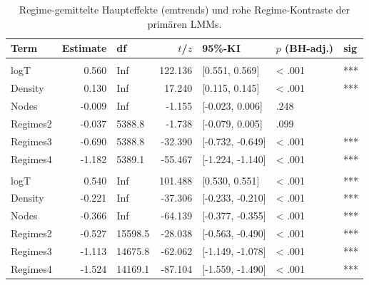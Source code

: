 \begin{table}[!h]
\centering
\caption{\label{tab:main_effects_averaged}Regime-gemittelte Haupteffekte (emtrends) und rohe Regime-Kontraste der prim\"aren LMMs.}
\centering
\begin{threeparttable}
\begin{tabular}[t]{lrlrlll}
\toprule
Term & Estimate & df & $t$/$z$ & 95\%-KI & $p$ (BH-adj.) & sig\\
\midrule
\addlinespace[0.3em]
\multicolumn{7}{l}{\textbf{temporal (A)}}\\
\hspace{1em}logT & 0.560 & Inf & 122.136 & {}[0.551, 0.569] & < .001 & ***\\
\hspace{1em}Density & 0.130 & Inf & 17.240 & {}[0.115, 0.145] & < .001 & ***\\
\hspace{1em}Nodes & -0.009 & Inf & -1.155 & {}[-0.023, 0.006] & .248 & \\
\hspace{1em}Regimes2 & -0.037 & 5388.8 & -1.738 & {}[-0.079, 0.005] & .099 & \\
\hspace{1em}Regimes3 & -0.690 & 5388.8 & -32.390 & {}[-0.732, -0.649] & < .001 & ***\\
\hspace{1em}Regimes4 & -1.182 & 5389.1 & -55.467 & {}[-1.224, -1.140] & < .001 & ***\\
\addlinespace[0.3em]
\multicolumn{7}{l}{\textbf{contemporaneous (K)}}\\
\hspace{1em}logT & 0.540 & Inf & 101.488 & {}[0.530, 0.551] & < .001 & ***\\
\hspace{1em}Density & -0.221 & Inf & -37.306 & {}[-0.233, -0.210] & < .001 & ***\\
\hspace{1em}Nodes & -0.366 & Inf & -64.139 & {}[-0.377, -0.355] & < .001 & ***\\
\hspace{1em}Regimes2 & -0.527 & 15598.5 & -28.038 & {}[-0.563, -0.490] & < .001 & ***\\
\hspace{1em}Regimes3 & -1.113 & 14675.8 & -62.062 & {}[-1.149, -1.078] & < .001 & ***\\
\hspace{1em}Regimes4 & -1.524 & 14169.1 & -87.104 & {}[-1.559, -1.490] & < .001 & ***\\

\end{tabular}
\end{threeparttable}
\end{table}
